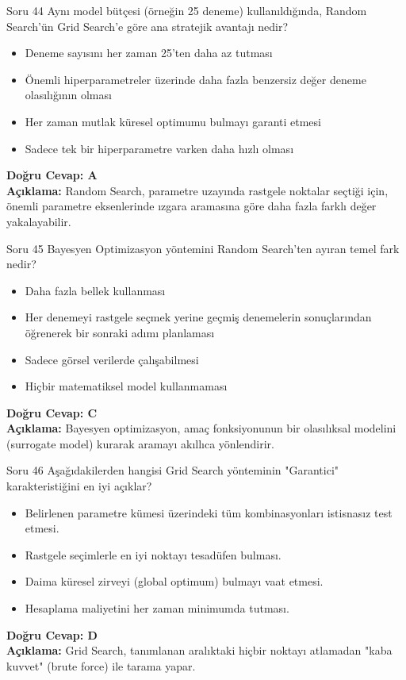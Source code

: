 \documentclass[12pt,a4paper]{article}
\begin{document}
\begin{testcard}{Soru 44}
    Aynı model bütçesi (örneğin 25 deneme) kullanıldığında, Random Search'ün Grid Search'e göre ana stratejik avantajı nedir?
    \begin{itemize}
        \item[A)] Deneme sayısını her zaman 25'ten daha az tutması
        \item[B)] Önemli hiperparametreler üzerinde daha fazla benzersiz değer deneme olasılığının olması
        \item[C)] Her zaman mutlak küresel optimumu bulmayı garanti etmesi
        \item[D)] Sadece tek bir hiperparametre varken daha hızlı olması
    \end{itemize}
    \tcblower
    \textbf{Doğru Cevap: A} \\
    \textbf{Açıklama:} Random Search, parametre uzayında rastgele noktalar seçtiği için, önemli parametre eksenlerinde ızgara aramasına göre daha fazla farklı değer yakalayabilir.
\end{testcard}

\begin{testcard}{Soru 45}
    Bayesyen Optimizasyon yöntemini Random Search'ten ayıran temel fark nedir?
    \begin{itemize}
        \item[A)] Daha fazla bellek kullanması
        \item[B)] Her denemeyi rastgele seçmek yerine geçmiş denemelerin sonuçlarından öğrenerek bir sonraki adımı planlaması
        \item[C)] Sadece görsel verilerde çalışabilmesi
        \item[D)] Hiçbir matematiksel model kullanmaması
    \end{itemize}
    \tcblower
    \textbf{Doğru Cevap: C} \\
    \textbf{Açıklama:} Bayesyen optimizasyon, amaç fonksiyonunun bir olasılıksal modelini (surrogate model) kurarak aramayı akıllıca yönlendirir.
\end{testcard}

\begin{testcard}{Soru 46}
    Aşağıdakilerden hangisi Grid Search yönteminin "Garantici" karakteristiğini en iyi açıklar?
    \begin{itemize}
        \item[A)] Belirlenen parametre kümesi üzerindeki tüm kombinasyonları istisnasız test etmesi.
        \item[B)] Rastgele seçimlerle en iyi noktayı tesadüfen bulması.
        \item[C)] Daima küresel zirveyi (global optimum) bulmayı vaat etmesi.
        \item[D)] Hesaplama maliyetini her zaman minimumda tutması.
    \end{itemize}
    \tcblower
    \textbf{Doğru Cevap: D} \\
    \textbf{Açıklama:} Grid Search, tanımlanan aralıktaki hiçbir noktayı atlamadan "kaba kuvvet" (brute force) ile tarama yapar.
\end{testcard}
\end{document}
